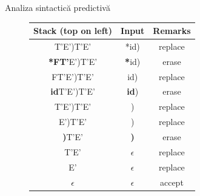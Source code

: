 \documentclass[pdf]{beamer}
\begin{document}
\begin{frame}{Analiza sintactică predictivă}
\begin{figure}
\begin{table}[H]
\begin{tabular}{c | c | c }

Stack (top on left) & Input & Remarks \\
\hline
T'E')T'E'& *id) & replace \\
\hline
\textbf{*FT'}E')T'E'& \textbf{*}id) & erase \\
\hline
FT'E')T'E'& id) & replace \\
\hline
\textbf{id}T'E')T'E'& \textbf{id}) & erase \\
\hline
T'E')T'E'& ) & replace \\
\hline
E')T'E'& ) & replace \\
\hline
\textbf{)}T'E'& \textbf{)} & erase \\
\hline
T'E'& $ \epsilon $ & replace \\
\hline
E'& $ \epsilon $ & replace \\
\hline
$ \epsilon $ & $ \epsilon $ & accept \\
\hline
\end{tabular}
\end{table}
\end{figure}
\end{frame}
\end{document}
